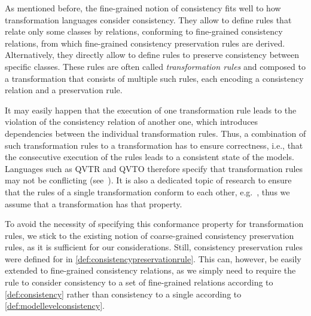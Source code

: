 As mentioned before, the fine-grained notion of consistency fits well to how transformation languages consider consistency.
They allow to define rules that relate only some classes by relations, conforming to fine-grained consistency relations, from which fine-grained consistency preservation rules are derived.
Alternatively, they directly allow to define rules to preserve consistency between specific classes.
These rules are often called \emph{transformation rules} and composed to a transformation that consists of multiple such rules, each encoding a consistency relation and a preservation rule.

It may easily happen that the execution of one transformation rule leads to the violation of the consistency relation of another one, which introduces dependencies between the individual transformation rules.
Thus, a combination of such transformation rules to a transformation has to ensure correctness, i.e., that the consecutive execution of the rules leads to a consistent state of the models.
Languages such as \gls{QVTR} and \gls{QVTO} therefore specify that transformation rules may not be conflicting (see~\cite[7.10.2.]{qvt}).
It is also a dedicated topic of research to ensure that the rules of a single transformation conform to each other, e.g.~\cite{cuadrado2017tse,cabot2010VerificationInvariants-JSS}, thus we assume that a transformation has that property.

To avoid the necessity of specifying this conformance property for transformation rules, we stick to the existing notion of coarse-grained consistency preservation rules, as it is sufficient for our considerations.
Still, consistency preservation rules were defined for \modellevelconsistencyrelations in \autoref{def:consistencypreservationrule}.
This can, however, be easily extended to fine-grained consistency relations, as we simply need to require the rule to consider consistency to a set of fine-grained relations according to \autoref{def:consistency} rather than consistency to a single \modellevelconsistencyrelation according to \autoref{def:modellevelconsistency}.

